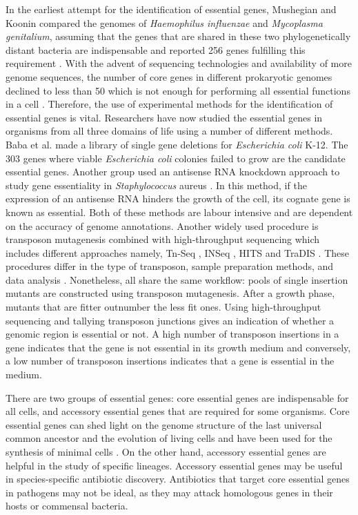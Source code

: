 \documentclass[12pt,letterpaper]{article}
\begin{document}
In the earliest attempt for the identification of essential genes, Mushegian and Koonin compared the genomes of \textit{Haemophilus influenzae} and \textit{Mycoplasma genitalium}, assuming that the genes that are shared in these two phylogenetically distant bacteria are indispensable and reported 256 genes fulfilling this requirement \cite{mushegian_minimal_1996}. With the advent of sequencing technologies and availability of more genome sequences, the number of core genes in different prokaryotic genomes declined to less than 50 which is not enough for performing all essential functions in a cell \cite{charlebois_computing_2004}. Therefore, the use of experimental methods for the identification of essential genes is vital. Researchers have now studied the essential genes in organisms from all three domains of life \cite{luo_deg_2014} using a number of different methods. Baba et al.\@ \cite{baba_construction_2006} made a library of single gene deletions for \textit{Escherichia coli} K-12. The 303 genes where viable \textit{Escherichia coli} colonies failed to grow are the candidate essential genes. Another group used an antisense RNA knockdown approach to study gene essentiality in \textit{Staphylococcus} aureus \cite{forsyth_genome-wide_2002}. In this method, if the expression of an antisense RNA hinders the growth of the cell, its cognate gene is known as essential. Both of these methods are labour intensive and are dependent on the accuracy of genome annotations. Another widely used procedure is transposon mutagenesis combined with high-throughput sequencing \cite{chao_design_2016, van_opijnen_transposon_2013, barquist_approaches_2013} which includes different approaches namely, Tn-Seq \cite{van_opijnen_tn-seq:_2009}, INSeq \cite{goodman_identifying_2009}, HITS \cite{gawronski_tracking_2009} and TraDIS \cite{langridge_simultaneous_2009}. These procedures differ in the type of transposon, sample preparation methods, and data analysis \cite{van_opijnen_transposon_2013}. Nonetheless, all share the same workflow: pools of single insertion mutants are constructed using transposon mutagenesis. After a growth phase, mutants that are fitter outnumber the less fit ones. Using high-throughput sequencing and tallying transposon junctions gives an indication of whether a genomic region is essential or not. A high number of transposon insertions in a gene indicates that the gene is not essential in its growth medium and conversely, a low number of transposon insertions indicates that a gene is essential in the medium.

There are two groups of essential genes: core essential genes are indispensable for all cells, and accessory essential genes that are required for some organisms. Core essential genes can shed light on the genome structure of the last universal common ancestor and the evolution of living cells \cite{koonin_comparative_2003} and have been used for the synthesis of minimal cells \cite{hutchison_design_2016}. On the other hand, accessory essential genes are helpful in the study of specific lineages. Accessory essential genes may be useful in species-specific antibiotic discovery. Antibiotics that target core essential genes in pathogens may not be ideal, as they may attack homologous genes in their hosts or commensal bacteria.
\end{document}
